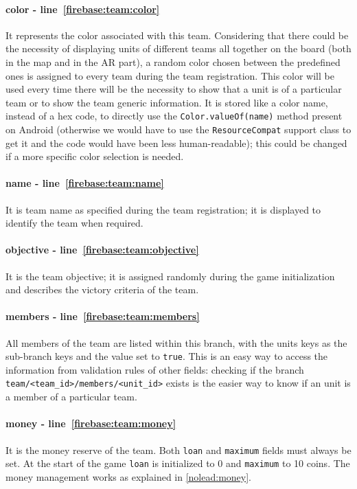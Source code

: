 				\paragraph{color - line~\ref{firebase:team:color}}
				It represents the color associated with this team. Considering that there could be the necessity of displaying units of different teams all together on the board (both in the map and in the AR part), a random color chosen between the predefined ones is assigned to every team during the team registration. This color will be used every time there will be the necessity to show that a unit is of a particular team or to show the team generic information.
				It is stored like a color name, instead of a hex code, to directly use the \lstinline|Color.valueOf(name)| method present on Android (otherwise we would have to use the \lstinline|ResourceCompat| support class to get it and the code would have been less human-readable); this could be changed if a more specific color selection is needed.
			
				\paragraph{name - line~\ref{firebase:team:name}}
				It is team name as specified during the team registration; it is displayed to identify the team when required.
				
				\paragraph{objective - line~\ref{firebase:team:objective}}
				It is the team objective; it is assigned randomly during the game initialization and describes the victory criteria of the team.
			
				\paragraph{members - line~\ref{firebase:team:members}}
				All members of the team are listed within this branch, with the units keys as the sub-branch keys and the value set to \lstinline|true|. This is an easy way to access the information from validation rules of other fields: checking if the branch \lstinline|team/<team_id>/members/<unit_id>| exists is the easier way to know if an unit is a member of a particular team.
			
				\paragraph{money - line~\ref{firebase:team:money}}
				It is the money reserve of the team. Both \lstinline|loan| and \lstinline|maximum| fields must always be set. At the start of the game \lstinline|loan| is initialized to 0 and \lstinline|maximum| to 10 coins.
				The money management works as explained in \autoref{nolead:money}.
				
